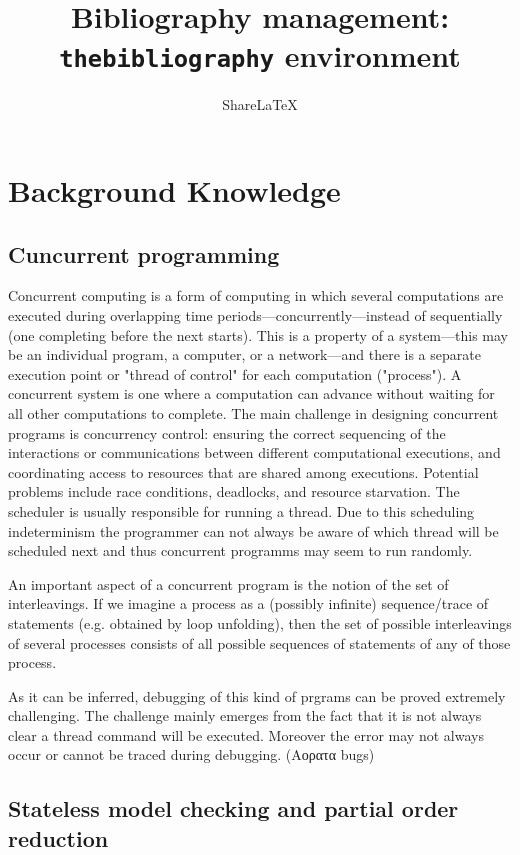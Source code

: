 \documentclass[a4paper,10pt]{article}
\title{Bibliography management:\\\texttt{thebibliography} environment}
\author{Share\LaTeX}
\begin{document}
\maketitle

\section*{Background Knowledge}

\subsection{Cuncurrent programming}

Concurrent computing is a form of computing in which several computations are executed during overlapping time 
periods—concurrently—instead of sequentially (one completing before the next starts). 
This is a property of a system—this may be an individual program, a computer, or a network—and there is a separate execution point 
or "thread of control" for each computation ("process"). A concurrent system is one where a computation can advance without waiting for 
all other computations to complete.
The main challenge in designing concurrent programs is concurrency control: ensuring the correct sequencing of the 
interactions or communications between different computational executions, and coordinating access to resources that are shared among executions.
Potential problems include race conditions, deadlocks, and resource starvation. 
The scheduler is usually responsible for running a thread. Due to this scheduling indeterminism the programmer can not always be aware of which thread
will be scheduled next and thus concurrent programms may seem to run randomly. 

An important aspect of a concurrent program is the notion of the set of interleavings. 
If we imagine a process as a (possibly infinite) sequence/trace of statements (e.g. obtained by loop unfolding),
then the set of possible interleavings of several processes consists of all possible sequences of statements of any of those process.

As it can be inferred, debugging of this kind of prgrams can be proved extremely challenging. The challenge mainly emerges from the fact that it is 
not always clear a thread command will be executed. Moreover the error may not always occur or cannot be traced during debugging. (Αορατα bugs)


\subsection{Stateless model checking and partial order reduction}
\end{document}
